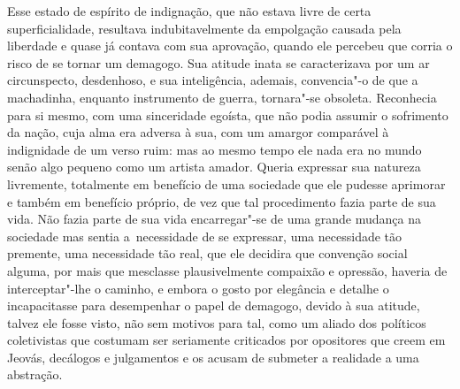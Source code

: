 Esse estado de espírito de indignação, que não estava livre de certa
superficialidade, resultava indubitavelmente da empolgação causada pela
liberdade e quase já contava com sua aprovação, quando ele percebeu que corria
o risco de se tornar um demagogo.  Sua atitude inata se caracterizava por um ar
circunspecto, desdenhoso, e sua inteligência, ademais, convencia"-o de que a
machadinha, enquanto instrumento de guerra, tornara"-se obsoleta.  Reconhecia
para si mesmo, com uma sinceridade egoísta, que não podia assumir o sofrimento
da nação, cuja alma era adversa à sua, com um amargor comparável à indignidade
de um verso ruim: mas ao mesmo tempo ele nada era no mundo senão algo pequeno
como um artista amador.  Queria expressar sua natureza livremente, totalmente
em benefício de uma sociedade que ele pudesse aprimorar e também em benefício
próprio, de vez que tal procedimento fazia parte de sua vida.  Não fazia parte
de sua vida encarregar"-se de uma grande mudança na sociedade mas sentia \mbox{a
necessidade} de se expressar, uma necessidade tão premente, uma necessidade tão
real, que ele decidira que convenção social alguma, por mais que mesclasse
plausivelmente compaixão e opressão, haveria de interceptar"-lhe o caminho, e
embora o gosto por elegância e detalhe o incapacitasse para desempenhar o papel
de demagogo, devido à sua atitude, talvez ele fosse visto, não sem motivos para
tal, como um aliado dos políticos coletivistas que costumam ser seriamente
criticados por opositores que creem em Jeovás, decálogos e julgamentos
e os acusam de submeter a realidade a uma abstração.

